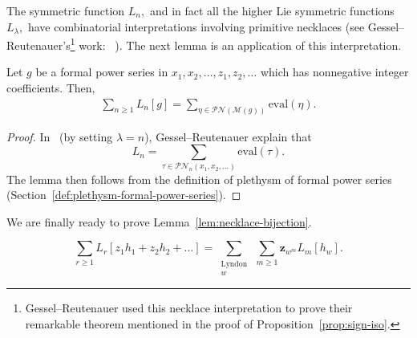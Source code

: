 \documentclass[ALCO, Unicode]{cedram}
\begin{document}
The symmetric function $L_n,$ and in fact all the higher Lie symmetric functions~$L_\lambda,$ have combinatorial interpretations involving primitive necklaces (see {Gessel--Reutenauer's}\footnote{Gessel--Reutenauer used this necklace interpretation to prove their remarkable theorem mentioned in the proof of Proposition~\ref{prop:sign-iso}.} work: ~\cite[Equation 2.1]{gesselreutenauer}). The next lemma is an application of this interpretation.

\begin{lemma}\label{lem:Lie-plethysm-in-terms-of-necklaces}
 Let $g$ be a formal power series in $x_1, x_2, \ldots, z_1, z_2, \ldots $ which has nonnegative integer coefficients. Then,
\begin{align*}
        \sum_{n \geq 1}L_n[g] = \sum_{\eta \in \mathscr{PN}(\mathcal{M}(g))} \mathrm{eval}(\eta).
    \end{align*}
\end{lemma}
\begin{proof}
 In~\cite[Equation 2.1]{gesselreutenauer} (by setting $\lambda = n$), Gessel--Reutenauer explain that \[L_n = \sum_{\tau \in \mathscr{PN}_n(x_1, x_2, \ldots)}\mathrm{eval}(\tau).\] The lemma then follows from the definition of plethysm of formal power series (Section~\ref{def:plethysm-formal-power-series}). 
\end{proof}

We are finally ready to prove Lemma~\ref{lem:necklace-bijection}.
\begin{lemma} \label{lem:necklace-bijection}
    \[ \sum_{r \geq 1} L_r[z_1h_1 + z_2h_2  + \ldots] = \sum_{\substack{\text{Lyndon}\\w}} \ \sum_{m \geq 1}\mathbf{z}_{w^m}L_m[h_w].\]
\end{lemma}
\end{document}
